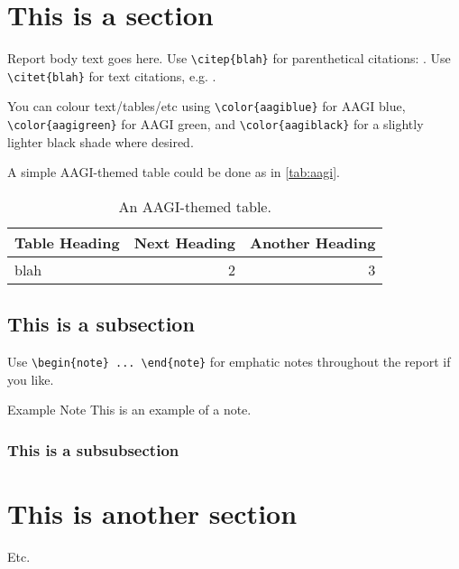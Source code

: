 \documentclass[12pt]{article}
\begin{document}
  \mainmatter
  \pagestyle{fancy}

  \clearpage
  \section{This is a section}
  
  Report body text goes here. Use \verb|\citep{blah}| for parenthetical
  citations: \citep{blah}. Use \verb|\citet{blah}| for text citations, e.g.
  \citet{blah}.
  
  You can colour text/tables/etc using \verb|\color{aagiblue}|
  for {\color{aagiblue}AAGI blue}, \verb|\color{aagigreen}| for
  {\color{aagigreen}AAGI green}, and \verb|\color{aagiblack}| for
  a {\color{aagiblack}slightly lighter black shade} where desired.
  
  A simple AAGI-themed table could be done as in \autoref{tab:aagi}.
  \begin{table}[h]
    \caption{An AAGI-themed table.}\label{tab:aagi}
    \centering
    \begin{tabular}{| l | r r |}
    \rowcolor{aagiblue} {\color{white}Table Heading} & %
    {\color{white}Next Heading} & {\color{white}Another Heading} \\
    \hline
    blah & 2 & 3 \\
    \hline
    \end{tabular}
  \end{table}

  \subsection{This is a subsection}
  Use \verb|\begin{note} ... \end{note}| for emphatic notes throughout
  the report if you like.
  
  \begin{note}
    {\sbf\color{aagiblue!75!black} Example Note}\quad
    This is an example of a note.
  \end{note}

  \subsubsection{This is a subsubsection}

  \clearpage
  \section{This is another section}
  Etc.
\end{document}
